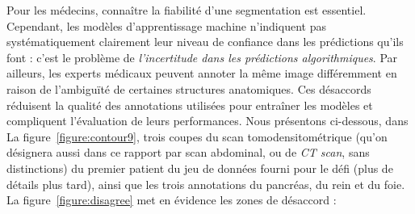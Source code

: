 \documentclass[a4paper,french,bookmarks,12pt]{article}
\begin{document}
    Pour les médecins, connaître la fiabilité d'une segmentation est essentiel. Cependant, les modèles d’apprentissage machine n'indiquent pas systématiquement clairement leur niveau de confiance dans les prédictions qu'ils font : c'est le problème de \emph{l'incertitude dans les prédictions algorithmiques}. Par ailleurs, les experts médicaux peuvent annoter la même image différemment en raison de l'ambiguïté de certaines structures anatomiques. Ces désaccords réduisent la qualité des annotations utilisées pour entraîner les modèles et compliquent l'évaluation de leurs performances.     Nous présentons ci-dessous, dans La figure~\ref{figure:contour9}, trois coupes du scan tomodensitométrique (qu'on désignera aussi dans ce rapport par scan abdominal, ou de \emph{CT scan}, sans distinctions) du premier patient du jeu de données fourni pour le défi  (plus de détails plus tard), ainsi que les trois annotations du pancréas, du rein et du foie. La figure~\ref{figure:disagree} met en évidence les zones de désaccord :
\end{document}
